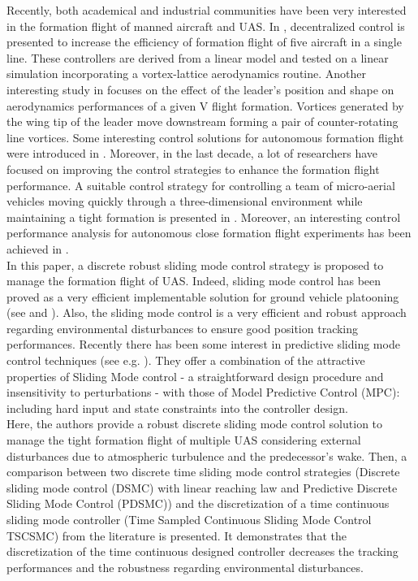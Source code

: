 \documentclass{ifacconf}
\begin{document}
Recently, both academical and industrial communities have been very interested in the formation flight of manned aircraft and UAS. In \cite{wolfe1996decentralized}, decentralized control is presented to increase the efficiency of formation flight of five aircraft in a single line. These controllers are derived from a linear model and tested on a linear simulation incorporating a vortex-lattice aerodynamics routine. Another interesting study in \cite{thien2008effects} focuses on the effect of the leader's position and shape on aerodynamics performances of a given V flight formation. Vortices generated by the wing tip of the leader move downstream forming a pair of counter-rotating line vortices. Some interesting control solutions for autonomous formation flight were introduced in \cite{giulietti2000autonomous}. Moreover, in the last decade, a lot of researchers have focused on improving the control strategies to enhance the formation flight performance. A suitable control strategy for  controlling a team of micro-aerial vehicles moving quickly through a three-dimensional environment while maintaining a tight formation is presented in \cite{turpin2012trajectory}. Moreover, an interesting control performance analysis for autonomous close formation flight experiments has been achieved in \cite{rice2014control}.\\
In this paper, a discrete robust sliding mode control strategy is proposed to manage the formation flight of UAS. Indeed, sliding mode control has been proved as a very efficient implementable solution for ground vehicle platooning (see \cite{ferrara2008sliding} and \cite{zou2013distributed}). Also, the sliding mode control is a very efficient and robust approach regarding environmental disturbances to ensure good position tracking performances. 
Recently there has been some interest in predictive sliding mode control techniques (see e.g. \cite{perez2010robust,houda2013new}). They offer a combination of the attractive properties of Sliding Mode control - a straightforward design procedure and insensitivity to perturbations - with those of Model Predictive Control (MPC): including hard input and state constraints into the controller design.\\
Here, the authors provide a robust discrete sliding mode control solution to manage the tight formation flight of multiple UAS considering external disturbances due to atmospheric turbulence and the predecessor's wake. Then, a comparison between two discrete time sliding mode control strategies (Discrete sliding mode control (DSMC) with linear reaching law and Predictive Discrete Sliding Mode Control (PDSMC)) and the discretization of a time continuous sliding mode controller (Time Sampled Continuous Sliding Mode Control TSCSMC) from the literature is presented. It demonstrates that the discretization of the time continuous designed controller decreases the tracking performances and the robustness regarding environmental disturbances.
\end{document}
